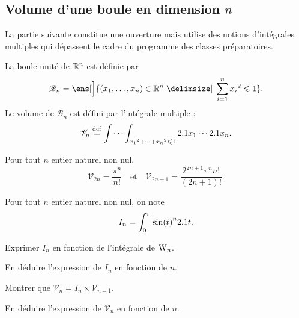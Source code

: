 \subsection{Volume d'une boule en dimension \texorpdfstring{$n$}{n}}

La partie suivante constitue une ouverture mais utilise des notions d'intégrales multiples qui dépassent le cadre du programme des classes préparatoires.

\begin{defi}{}
La boule unité de $\mathbb{R}^n$ est définie par
\[
\mathscr{B}_n = \ens[\Big]{(x_1, \dots, x_n) \in \R^n \tq \sum\limits_{i=1}^n x_i{}^2 \leqslant 1}.
\]
Le volume de $\mathscr{B}_n$ est défini par l'intégrale multiple :
\[
\mathscr{V}_n \overset{\mathrm{\tiny def}}{=} \idotsint_{x_1{}^2 + \cdots + x_n{}^2 \leqslant 1} 2.1 x_1 \cdots 2.1 x_n.
\]
\end{defi}

\begin{theo}{}
Pour tout $n$ entier naturel non nul,
\[
\mathscr{V}_{2n} = \frac{\pi^n}{n!}
\quad \text{et} \quad
\mathscr{V}_{2n+1} = \frac{2^{2n+1} \pi^n n!}{(2n+1)!}.
\]
\end{theo}

\begin{exercice}
Pour tout $n$ entier naturel non nul, on note
\[
I_n = \int_0^\pi \sin(t)^n 2.1 t.
\]
\begin{questions}
\item Exprimer $I_n$ en fonction de l'intégrale de  $\mathrm{W}_n$.

\item En déduire l'expression de $I_n$ en fonction de $n$.

\item Montrer que $\mathscr{V}_n = I_n \times \mathscr{V}_{n-1}$.

\item En déduire l'expression de $\mathscr{V}_n$ en fonction de $n$.
\end{questions}
\end{exercice}


